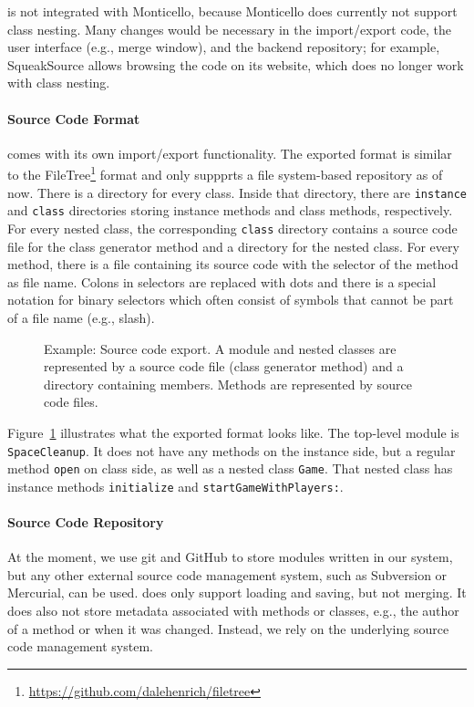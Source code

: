 \msname is not integrated with Monticello, because Monticello does currently not support class nesting. Many changes would be necessary in the import/export code, the user interface (e.g., merge window), and the backend repository; for example, SqueakSource allows browsing the code on its website, which does no longer work with class nesting.

\paragraph{Source Code Format}
\msname comes with its own import/export functionality. The exported format is similar to the FileTree\footnote{\url{https://github.com/dalehenrich/filetree}} format and only suppprts a file system-based repository as of now. There is a directory for every class. Inside that directory, there are \texttt{instance} and \texttt{class} directories storing instance methods and class methods, respectively. For every nested class, the corresponding \texttt{class} directory contains a source code file for the class generator method and a directory for the nested class. For every method, there is a file containing its source code with the selector of the method as file name. Colons in selectors are replaced with dots and there is a special notation for binary selectors which often consist of symbols that cannot be part of a file name (e.g., slash).

\begin{figure}[!htp]
\caption[Example: Source code export]{Example: Source code export. A module and nested classes are represented by a source code file (class generator method) and a directory containing members. Methods are represented by source code files.}
\label{fig:impl_source_export}
\end{figure}

Figure~\ref{fig:impl_source_export} illustrates what the exported format looks like. The top-level module is \texttt{SpaceCleanup}. It does not have any methods on the instance side, but a regular method \texttt{open} on class side, as well as a nested class \texttt{Game}. That nested class has instance methods \texttt{initialize} and \texttt{startGameWithPlayers:}.

\paragraph{Source Code Repository}
At the moment, we use git and GitHub to store modules written in our system, but any other external source code management system, such as Subversion or Mercurial, can be used. \msname does only support loading and saving, but not merging. It does also not store metadata associated with methods or classes, e.g., the author of a method or when it was changed. Instead, we rely on the underlying source code management system.

